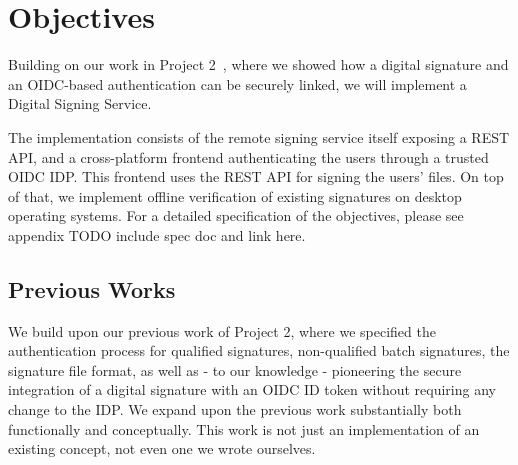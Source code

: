 \chapter{Objectives}
\label{ch:objectives}

Building on our work in Project 2~\cite{projekt2},
where we showed how a digital signature and an \gls{OIDC}-based authentication can be securely linked,
we will implement a Digital Signing Service.

The implementation consists of the remote signing service itself exposing a \gls{REST} \gls{API},
and a cross-platform frontend authenticating the users through a trusted \gls{OIDC} \gls{IDP}.
This frontend uses the \gls{REST} \gls{API} for signing the users' files.
On top of that, we implement offline verification of existing signatures on desktop operating systems.
For a detailed specification of the objectives, please see appendix TODO include spec doc and link here.

\section{Previous Works}
\label{section:previousworks}

We build upon our previous work of Project 2\cite{projekt2}, where we specified the authentication process
for qualified signatures, non-qualified batch signatures, the signature file format,
as well as - to our knowledge - pioneering the secure integration of a digital signature with an \gls{OIDC} ID token without requiring any change to the \gls{IDP}.
We expand upon the previous work substantially both functionally and conceptually.
This work is not just an implementation of an existing concept, not even one we wrote ourselves.

